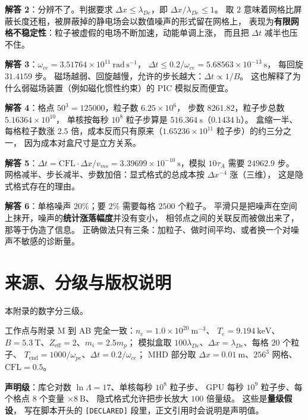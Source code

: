 \textbf{解答 2}：分辨不了。判据要求 $\Delta x\le\lambda_{De}$，即 $\Delta x/\lambda_{De}\le1$。
取 $2$ 意味着网格比屏蔽长度还粗，被屏蔽掉的静电场会以数值噪声的形式留在网格上，
表现为\textbf{有限网格不稳定性}：粒子被虚假的电场不断加速，动能单调上涨，
而且把 $\Delta t$ 减半也压不住。

\textbf{解答 3}：$\omega_{ce}=3.51764\times10^{11}\ \mathrm{rad\,s^{-1}}$，
$\Delta t\le0.2/\omega_{ce}=5.68563\times10^{-13}\ \mathrm{s}$，
每回旋 $31.4159$ 步。
磁场越弱、回旋越慢，允许的步长越大：$\Delta t\propto1/B$。
这也解释了为什么弱磁场装置（例如磁化惯性约束）的 PIC 模拟反而便宜。

\textbf{解答 4}：格点 $50^3=125000$，粒子数 $6.25\times10^{6}$，
步数 $8261.82$，粒子步总数 $5.16364\times10^{10}$，
单核按每秒 $10^{8}$ 粒子步算是 $516.364\ \mathrm{s}$（$0.1434\ \mathrm{h}$）。
盒缩一半、每格粒子数涨 $2.5$ 倍，成本反而只有原来（$1.65236\times10^{11}$ 粒子步）的约三分之一，
因为成本对盒尺寸是立方关系。

\textbf{解答 5}：$\Delta t=\mathrm{CFL}\cdot\Delta x/v_{ms}
=3.39699\times10^{-10}\ \mathrm{s}$，模拟 $10\tau_A$ 需要 $24962.9$ 步。
网格减半、步长减半、步数加倍：显式格式的总成本按 $\Delta x^{-4}$ 涨（三维），
这是隐式格式存在的理由。

\textbf{解答 6}：单格噪声 $20\%$；要 $2\%$ 需要每格 $2500$ 个粒子。
平滑只是把噪声在空间上抹开，噪声的\textbf{统计涨落幅度}并没有变小，
相邻点之间的关联反而被做出来了，那等于伪造了信息。
正确做法只有三条：加粒子、做时间平均、或者换一个对噪声不敏感的诊断量。

\section{来源、分级与版权说明}
\label{sec:app-ac-source}

\begingroup\small
本附录的数字分三级。

工作点与附录 M 到 AB 完全一致：$n_e=1.0\times10^{20}\ \mathrm{m^{-3}}$、
$T_e=9.194\ \mathrm{keV}$、$B=5.3\ \mathrm{T}$、$Z_{\mathrm{eff}}=2$、$m_i=2.5m_p$；
模拟盒取 $100\lambda_{De}$、$\Delta x=\lambda_{De}$、每格 $20$ 个粒子、
$T_{\mathrm{end}}=1000/\omega_{pe}$、$\Delta t=0.2/\omega_{ce}$；
MHD 部分取 $\Delta x=0.01\ \mathrm{m}$、$256^3$ 网格、$\mathrm{CFL}=0.5$。

\textbf{声明级}：库仑对数 $\ln\Lambda=17$、单核每秒 $10^{8}$ 粒子步、
GPU 每秒 $10^{9}$ 粒子步、每个格点 $8$ 个变量 $\times8\ \mathrm{B}$、
隐式格式允许把步长放大 $100$ 倍量级。
这些是\textbf{量级假设}，
写在脚本开头的 \texttt{[DECLARED]} 段里，正文引用时会说明是声明值。

